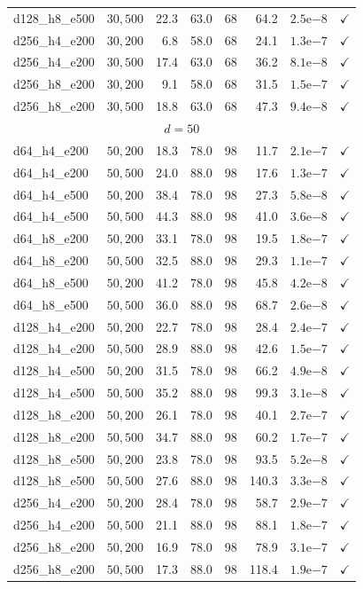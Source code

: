 \documentclass[12pt,a4paper]{article}
\begin{document}
\begin{table}[H]
\begin{tabular}{llrrrrrc}
d128\_h8\_e500 & $30,500$ & 22.3 & 63.0 & 68 & 64.2 & $2.5$e$-8$ & $\checkmark$ \\
d256\_h4\_e200 & $30,200$ & 6.8 & 58.0 & 68 & 24.1 & $1.3$e$-7$ & $\checkmark$ \\
d256\_h4\_e200 & $30,500$ & 17.4 & 63.0 & 68 & 36.2 & $8.1$e$-8$ & $\checkmark$ \\
d256\_h8\_e200 & $30,200$ & 9.1 & 58.0 & 68 & 31.5 & $1.5$e$-7$ & $\checkmark$ \\
d256\_h8\_e200 & $30,500$ & 18.8 & 63.0 & 68 & 47.3 & $9.4$e$-8$ & $\checkmark$ \\
\midrule
\multicolumn{8}{c}{\textbf{$d=50$}} \\
\midrule
d64\_h4\_e200 & $50,200$ & 18.3 & 78.0 & 98 & 11.7 & $2.1$e$-7$ & $\checkmark$ \\
d64\_h4\_e200 & $50,500$ & 24.0 & 88.0 & 98 & 17.6 & $1.3$e$-7$ & $\checkmark$ \\
d64\_h4\_e500 & $50,200$ & 38.4 & 78.0 & 98 & 27.3 & $5.8$e$-8$ & $\checkmark$ \\
d64\_h4\_e500 & $50,500$ & 44.3 & 88.0 & 98 & 41.0 & $3.6$e$-8$ & $\checkmark$ \\
d64\_h8\_e200 & $50,200$ & 33.1 & 78.0 & 98 & 19.5 & $1.8$e$-7$ & $\checkmark$ \\
d64\_h8\_e200 & $50,500$ & 32.5 & 88.0 & 98 & 29.3 & $1.1$e$-7$ & $\checkmark$ \\
d64\_h8\_e500 & $50,200$ & 41.2 & 78.0 & 98 & 45.8 & $4.2$e$-8$ & $\checkmark$ \\
d64\_h8\_e500 & $50,500$ & 36.0 & 88.0 & 98 & 68.7 & $2.6$e$-8$ & $\checkmark$ \\
d128\_h4\_e200 & $50,200$ & 22.7 & 78.0 & 98 & 28.4 & $2.4$e$-7$ & $\checkmark$ \\
d128\_h4\_e200 & $50,500$ & 28.9 & 88.0 & 98 & 42.6 & $1.5$e$-7$ & $\checkmark$ \\
d128\_h4\_e500 & $50,200$ & 31.5 & 78.0 & 98 & 66.2 & $4.9$e$-8$ & $\checkmark$ \\
d128\_h4\_e500 & $50,500$ & 35.2 & 88.0 & 98 & 99.3 & $3.1$e$-8$ & $\checkmark$ \\
d128\_h8\_e200 & $50,200$ & 26.1 & 78.0 & 98 & 40.1 & $2.7$e$-7$ & $\checkmark$ \\
d128\_h8\_e200 & $50,500$ & 34.7 & 88.0 & 98 & 60.2 & $1.7$e$-7$ & $\checkmark$ \\
d128\_h8\_e500 & $50,200$ & 23.8 & 78.0 & 98 & 93.5 & $5.2$e$-8$ & $\checkmark$ \\
d128\_h8\_e500 & $50,500$ & 27.6 & 88.0 & 98 & 140.3 & $3.3$e$-8$ & $\checkmark$ \\
d256\_h4\_e200 & $50,200$ & 28.4 & 78.0 & 98 & 58.7 & $2.9$e$-7$ & $\checkmark$ \\
d256\_h4\_e200 & $50,500$ & 21.1 & 88.0 & 98 & 88.1 & $1.8$e$-7$ & $\checkmark$ \\
d256\_h8\_e200 & $50,200$ & 16.9 & 78.0 & 98 & 78.9 & $3.1$e$-7$ & $\checkmark$ \\
d256\_h8\_e200 & $50,500$ & 17.3 & 88.0 & 98 & 118.4 & $1.9$e$-7$ & $\checkmark$ \\
\bottomrule
\end{tabular}
\end{table}
\end{document}

